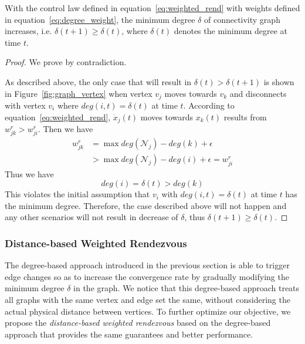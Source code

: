 \documentclass[../main.tex]{subfiles}
\begin{document}
\begin{preposition} \label{thm:delta_increase}
With the control law defined in equation~\ref{eq:weighted_rend} with weights defined in equation~\ref{eq:degree_weight}, the minimum degree $\delta$ of connectivity graph increases, i.e. $\delta(t+1) \geq \delta(t)$, where $\delta(t)$ denotes the minimum degree at time $t$. 
\end{preposition}
\begin{proof}
We prove by contradiction.

As described above, the only case that will result in $\delta(t) > \delta(t+1)$ is shown in Figure~\ref{fig:graph_vertex} when vertex $v_j$ moves towards $v_k$ and disconnects with vertex $v_i$ where $deg(i, t) = \delta(t)$ at time $t$. According to equation~\ref{eq:weighted_rend}, $\dot x_j(t)$ moves towards $x_k(t)$ results from $w_{jk}^r > w_{ji}^r$. Then we have
{\small \begin{align*}
w_{jk}^r &= \max deg(\mathcal{N}_j) - deg(k) + \epsilon \\
&> \max deg(\mathcal{N}_j) - deg(i) + \epsilon = w_{ji}^r
\end{align*}}
Thus we have
\begin{equation} 
    deg(i) = \delta(t) > deg(k)
\end{equation}
This violates the initial assumption that $v_i$ with $deg(i, t) = \delta(t)$ at time $t$ has the minimum degree. Therefore, the case described above will not happen and any other scenarios will not result in decrease of $\delta$, thus $\delta(t+1) \geq \delta(t)$.
\end{proof}

\subsubsection{Distance-based Weighted Rendezvous}
The degree-based approach introduced in the previous section is able to trigger edge changes so as to increase the convergence rate by gradually modifying the minimum degree $\delta$ in the graph. We notice that this degree-based approach treats all graphs with the same vertex and edge set the same, without considering the actual physical distance between vertices. To further optimize our objective, we propose the \textit{distance-based weighted rendezvous} based on the degree-based approach that provides the same guarantees and better performance.
\end{document}
